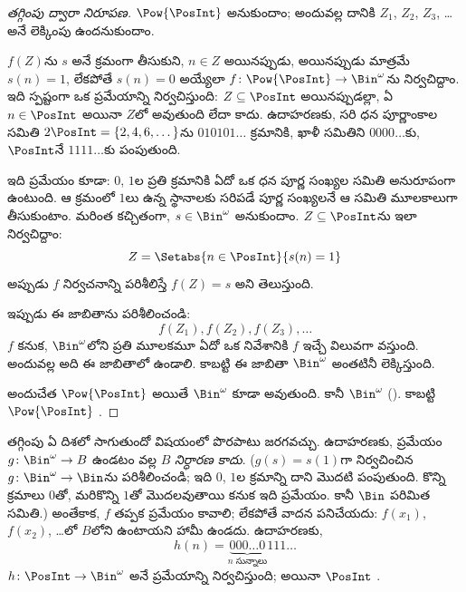 \documentclass[../../../include/open-logic-section]{subfiles}
\begin{document}
\begin{proof}[తగ్గింపు ద్వారా {} నిరూపణ]
$\Pow{\PosInt}$  అనుకుందాం; అందువల్ల దానికి
$Z_{1}$, $Z_{2}$, $Z_{3}$, \dots అనే లెక్కింపు ఉందనుకుందాం.

$f(Z)$ను $s$ అనే క్రమంగా తీసుకుని, $n \in Z$ అయినప్పుడు, అయినప్పుడు మాత్రమే
$s(n) = 1$, లేకపోతే $s(n) = 0$ అయ్యేలా
$f \colon \Pow{\PosInt} \to \Bin^\omega$ను నిర్వచిద్దాం. ఇది
స్పష్టంగా ఒక ప్రమేయాన్ని నిర్వచిస్తుంది: $Z \subseteq \PosInt$
అయినప్పుడల్లా, ఏ $n \in \PosInt$ అయినా $Z$లో 
అవుతుంది లేదా కాదు. ఉదాహరణకు, సరి ధన పూర్ణాంకాల సమితి
$2\PosInt = \{2, 4, 6, \dots\}$ను $010101\dots$ క్రమానికి,
ఖాళీ సమితిని $0000\dots$కు, $\PosInt$నే $1111\dots$కు పంపుతుంది.

ఇది  ప్రమేయం కూడా: $0$, $1$ల ప్రతి క్రమానికి ఏదో ఒక ధన
పూర్ణ సంఖ్యల సమితి అనురూపంగా ఉంటుంది. ఆ క్రమంలో $1$లు ఉన్న స్థానాలకు సరిపడే
పూర్ణ సంఖ్యలనే ఆ సమితి మూలకాలుగా తీసుకుంటాం. మరింత కచ్చితంగా,
$s \in \Bin^\omega$ అనుకుందాం. $Z \subseteq \PosInt$ను ఇలా
నిర్వచిద్దాం:
\[
Z = \Setabs{n \in \PosInt}{s(n) = 1}
\]
అప్పుడు $f$ నిర్వచనాన్ని పరిశీలిస్తే $f(Z) = s$ అని తెలుస్తుంది.

ఇప్పుడు ఈ జాబితాను పరిశీలించండి:
\[
f(Z_1), f(Z_2), f(Z_3), \dots
\]
$f$  కనుక, $\Bin^\omega$లోని ప్రతి మూలకమూ ఏదో ఒక
నివేశానికి $f$ ఇచ్చే విలువగా వస్తుంది. అందువల్ల అది ఈ జాబితాలో ఉండాలి.
కాబట్టి ఈ జాబితా $\Bin^\omega$ అంతటినీ లెక్కిస్తుంది.

అందుచేత $\Pow{\PosInt}$  అయితే $\Bin^\omega$ కూడా
 అవుతుంది. కానీ $\Bin^\omega$ 
(). కాబట్టి $\Pow{\PosInt}$
.
\end{proof}

\begin{explain}
తగ్గింపు ఏ దిశలో సాగుతుందో విషయంలో పొరపాటు జరగవచ్చు.
ఉదాహరణకు,  ప్రమేయం $g \colon \Bin^\omega \to B$
ఉండటం వల్ల $B$  \emph{నిర్ధారణ కాదు}.
($g(s) = s(1)$గా నిర్వచించిన $g \colon \Bin^\omega \to \Bin$ను
పరిశీలించండి; ఇది $0$, $1$ల క్రమాన్ని దాని మొదటి 
పంపుతుంది. కొన్ని క్రమాలు $0$తో, మరికొన్ని $1$తో మొదలవుతాయి కనుక
ఇది  ప్రమేయం. కానీ $\Bin$ పరిమిత సమితి.) అంతేకాక, $f$ తప్పక
 ప్రమేయం కావాలి; లేకపోతే వాదన పనిచేయదు: $f(x_1)$, $f(x_2)$,
\dots{}లో $B$లోని  ఉంటాయని హామీ ఉండదు. ఉదాహరణకు,
\[
h(n) = \underbrace{000\dots0}_{\text{$n$ సున్నాలు}}111\dots
\]
$h\colon \PosInt \to \Bin^\omega$ అనే ప్రమేయాన్ని నిర్వచిస్తుంది;
అయినా $\PosInt$ .
\end{explain}
\end{document}
